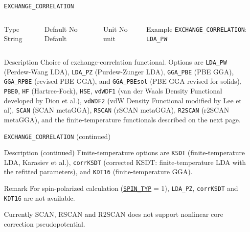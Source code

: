 \begin{frame}{\texttt{EXCHANGE\_CORRELATION}} \label{EXCHANGE_CORRELATION}
\vspace*{-12pt}
\begin{columns}
\begin{block}{Type}
String
\end{block}

\begin{block}{Default}
No Default
\end{block}

\begin{block}{Unit}
No unit
\end{block}

\begin{block}{Example}
\texttt{EXCHANGE\_CORRELATION}: \texttt{LDA\_PW}
\end{block}
\end{columns}

\begin{block}{Description}
Choice of exchange-correlation functional. Options are \texttt{LDA\_PW} (Perdew-Wang LDA), \texttt{LDA\_PZ} (Purdew-Zunger LDA), 
\texttt{GGA\_PBE} (PBE GGA), \texttt{GGA\_RPBE} (revised PBE GGA), and \texttt{GGA\_PBEsol} (PBE GGA revised for solids), 
\texttt{PBE0}, \texttt{HF} (Hartree-Fock), \texttt{HSE},
\texttt{vdWDF1} (van der Waals Density Functional developed by Dion et al.), \texttt{vdWDF2} (vdW Density Functional modified by Lee et al), \texttt{SCAN} (SCAN metaGGA), \texttt{RSCAN} (rSCAN metaGGA), \texttt{R2SCAN} (r2SCAN metaGGA), and the finite-temperature functionals described on the next page.
\end{block}

\end{frame}

\begin{frame}{\texttt{EXCHANGE\_CORRELATION} (continued)}
\vspace*{-12pt}
\begin{block}{Description (continued)}
Finite-temperature options are \texttt{KSDT} (finite-temperature LDA, Karasiev et al.), \texttt{corrKSDT} (corrected KSDT: finite-temperature LDA with the refitted parameters), and \texttt{KDT16} (finite-temperature GGA).
\end{block}

\begin{block}{Remark}
For spin-polarized calculation (\hyperlink{SPIN_TYP}{\texttt{SPIN\_TYP}} = 1), \texttt{LDA\_PZ}, \texttt{corrKSDT} and \texttt{KDT16} are not available.

Currently SCAN, RSCAN and R2SCAN does not support nonlinear core correction pseudopotential.
\end{block}

\end{frame}




